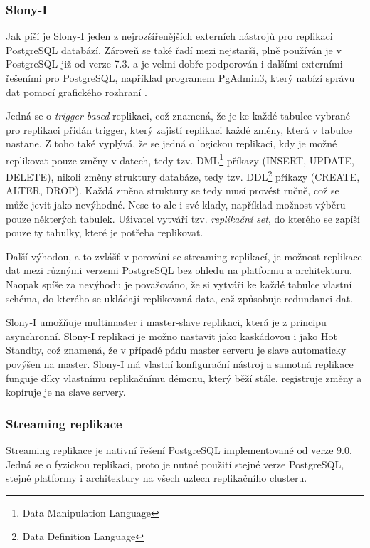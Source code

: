       \subsubsection{Slony-I}
      \label{kSlony}

      Jak píší \cite{Boszormenyi2013} je Slony-I jeden z nejrozšířenějších externích nástrojů pro replikaci PostgreSQL databází. Zároveň se také řadí mezi nejstarší, plně používán je v PostgreSQL již od verze 7.3. a je velmi dobře podporován i dalšími externími řešeními pro PostgreSQL, například programem PgAdmin3, který nabízí správu dat pomocí grafického rozhraní \citep{Boszormenyi2013}.

      Jedná se o {\it trigger-based} replikaci, což znamená, že je ke každé tabulce vybrané pro replikaci přidán trigger, který zajistí replikaci každé změny, která v tabulce nastane. Z toho také vyplývá, že se jedná o logickou replikaci, kdy je možné replikovat pouze změny v datech, tedy tzv. DML\footnote{Data Manipulation Language} příkazy (INSERT, UPDATE, DELETE), nikoli změny struktury databáze, tedy tzv. DDL\footnote{Data Definition Language} příkazy (CREATE, ALTER, DROP). Každá změna struktury se tedy musí provést ručně, což se může jevit jako nevýhodné. Nese to ale i své klady, například možnost výběru pouze některých tabulek. Uživatel vytváří tzv. {\it replikační set}, do kterého se zapíší pouze ty tabulky, které je potřeba replikovat. 

Další výhodou, a to zvlášť v porování se streaming replikací, je možnost replikace dat mezi různými verzemi PostgreSQL bez ohledu na platformu a architekturu. Naopak spíše za nevýhodu je považováno, že si vytváři ke každé tabulce vlastní schéma, do kterého se ukládají replikovaná data, což způsobuje redundanci dat. 

  Slony-I umožňuje multimaster i master-slave replikaci, která je z principu asynchronní. 
  Slony-I replikaci je možno nastavit jako kaskádovou i jako Hot Standby, což
  znamená, že v případě pádu master serveru je slave automaticky povýšen na
  master. Slony-I má vlastní konfigurační nástroj a samotná replikace funguje
  díky vlastnímu replikačnímu démonu, který běží stále, registruje změny a
  kopíruje je na slave servery.

  \subsubsection{Streaming replikace}
  \label{kStreamingTeorie}

  Streaming replikace je nativní řešení PostgreSQL implementované od verze
  9.0. Jedná se o fyzickou replikaci, proto je nutné použití stejné verze
  PostgreSQL, stejné platformy i architektury na všech uzlech replikačního
  clusteru. 
  
